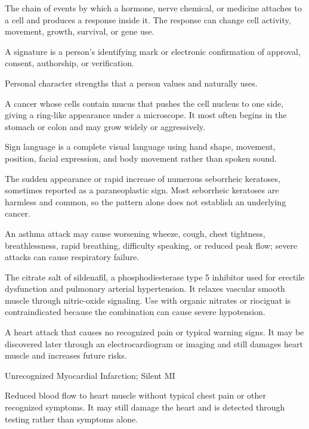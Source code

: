  The chain of events by which a hormone, nerve chemical, or medicine attaches to a cell and produces a response inside it. The response can change cell activity, movement, growth, survival, or gene use.

 A signature is a person’s identifying mark or electronic confirmation of approval, consent, authorship, or verification.

 Personal character strengths that a person values and naturally uses.

 A cancer whose cells contain mucus that pushes the cell nucleus to one side, giving a ring-like appearance under a microscope. It most often begins in the stomach or colon and may grow widely or aggressively.

 Sign language is a complete visual language using hand shape, movement, position, facial expression, and body movement rather than spoken sound.

 The sudden appearance or rapid increase of numerous seborrheic keratoses, sometimes reported as a paraneoplastic sign. Most seborrheic keratoses are harmless and common, so the pattern alone does not establish an underlying cancer.

 An asthma attack may cause worsening wheeze, cough, chest tightness, breathlessness, rapid breathing, difficulty speaking, or reduced peak flow; severe attacks can cause respiratory failure.

 The citrate salt of sildenafil, a phosphodiesterase type 5 inhibitor used
for erectile dysfunction and pulmonary arterial hypertension. It relaxes vascular smooth muscle through
nitric-oxide signaling. Use with organic nitrates or riociguat is contraindicated because the combination
can cause severe hypotension.

 A heart attack that causes no recognized pain or typical warning signs. It may be discovered later through an electrocardiogram or imaging and still damages heart muscle and increases future risks.

\synonyms
Unrecognized Myocardial Infarction; Silent MI

 Reduced blood flow to heart muscle without typical chest pain or other recognized symptoms. It may still damage the heart and is detected through testing rather than symptoms alone.

